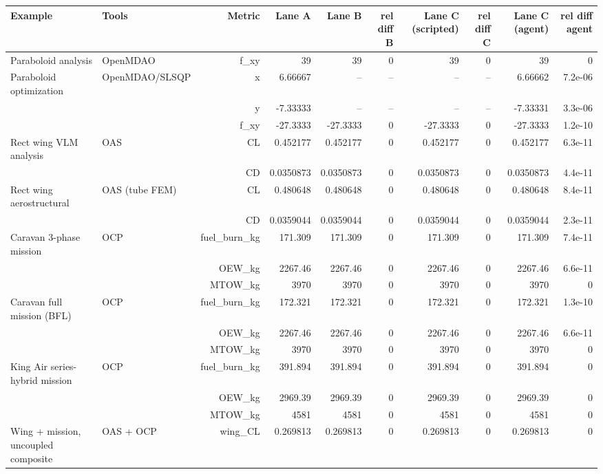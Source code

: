 \begin{tabular}{llrrrrrrrr}
\toprule
Example & Tools & Metric & Lane A & Lane B & rel diff B & Lane C (scripted) & rel diff C & Lane C (agent) & rel diff agent \\
\midrule
Paraboloid analysis & OpenMDAO & f\_xy & 39 & 39 & 0 & 39 & 0 & 39 & 0 \\
\addlinespace
Paraboloid optimization & OpenMDAO/SLSQP & x & 6.66667 & -- & -- & -- & -- & 6.66662 & 7.2e-06 \\
 &  & y & -7.33333 & -- & -- & -- & -- & -7.33331 & 3.3e-06 \\
 &  & f\_xy & -27.3333 & -27.3333 & 0 & -27.3333 & 0 & -27.3333 & 1.2e-10 \\
\addlinespace
Rect wing VLM analysis & OAS & CL & 0.452177 & 0.452177 & 0 & 0.452177 & 0 & 0.452177 & 6.3e-11 \\
 &  & CD & 0.0350873 & 0.0350873 & 0 & 0.0350873 & 0 & 0.0350873 & 4.4e-11 \\
\addlinespace
Rect wing aerostructural & OAS (tube FEM) & CL & 0.480648 & 0.480648 & 0 & 0.480648 & 0 & 0.480648 & 8.4e-11 \\
 &  & CD & 0.0359044 & 0.0359044 & 0 & 0.0359044 & 0 & 0.0359044 & 2.3e-11 \\
\addlinespace
Caravan 3-phase mission & OCP & fuel\_burn\_kg & 171.309 & 171.309 & 0 & 171.309 & 0 & 171.309 & 7.4e-11 \\
 &  & OEW\_kg & 2267.46 & 2267.46 & 0 & 2267.46 & 0 & 2267.46 & 6.6e-11 \\
 &  & MTOW\_kg & 3970 & 3970 & 0 & 3970 & 0 & 3970 & 0 \\
\addlinespace
Caravan full mission (BFL) & OCP & fuel\_burn\_kg & 172.321 & 172.321 & 0 & 172.321 & 0 & 172.321 & 1.3e-10 \\
 &  & OEW\_kg & 2267.46 & 2267.46 & 0 & 2267.46 & 0 & 2267.46 & 6.6e-11 \\
 &  & MTOW\_kg & 3970 & 3970 & 0 & 3970 & 0 & 3970 & 0 \\
\addlinespace
King Air series-hybrid mission & OCP & fuel\_burn\_kg & 391.894 & 391.894 & 0 & 391.894 & 0 & 391.894 & 0 \\
 &  & OEW\_kg & 2969.39 & 2969.39 & 0 & 2969.39 & 0 & 2969.39 & 0 \\
 &  & MTOW\_kg & 4581 & 4581 & 0 & 4581 & 0 & 4581 & 0 \\
\addlinespace
Wing + mission, uncoupled composite & OAS + OCP & wing\_CL & 0.269813 & 0.269813 & 0 & 0.269813 & 0 & 0.269813 & 0 \\

\end{tabular}
